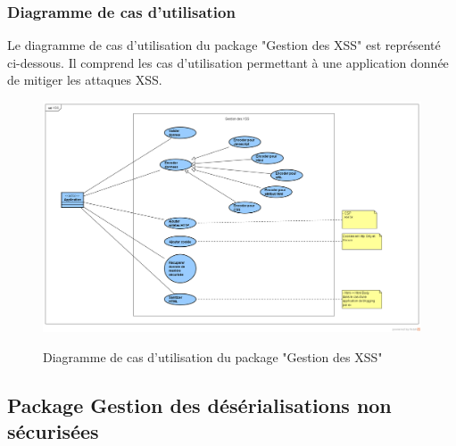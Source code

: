 \subsubsection{Diagramme de cas d'utilisation}
Le diagramme de cas d'utilisation du package "Gestion des XSS" est représenté ci-dessous. Il comprend les cas d'utilisation permettant à une application donnée de mitiger les attaques XSS.\\ 
\begin{figure}[H]
	\centering
	\begin{minipage}{12cm}
		\centering
		{\includegraphics[height=0.30\textheight]{fig/XSS-use-case-diagram.png}}
	\end{minipage}
	\caption{Diagramme de cas d'utilisation du package "Gestion des XSS"}
	\label{fig:7.8}
\end{figure}

\subsection{Package Gestion des désérialisations non sécurisées}
